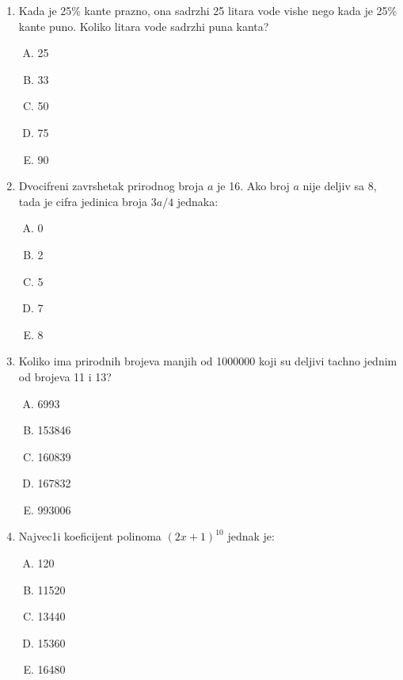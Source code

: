 \documentclass[a4paper,12pt]{article}
\newcommand{\Lat}{\fontencoding{OT1}\selectfont}
\begin{document}
\begin{enumerate}[1.]
\item Kada je 25\% kante prazno, ona sadrzhi 25 litara vode vishe nego kada je 25\% kante puno. Koliko litara vode sadrzhi puna kanta?
{\Lat
\begin{multicols}{5}
\begin{enumerate}[A)]
\item 25 \item 33 \item 50 \item 75 \item 90
\end{enumerate}
\end{multicols}
}
\item Dvocifreni zavrshetak prirodnog broja $a$ je 16. Ako broj $a$ nije deljiv sa 8, tada je cifra jedinica broja $3a/4$ jednaka:
{\Lat
\begin{multicols}{5}
\begin{enumerate}[A)]
\item 0 \item 2 \item 5 \item 7 \item 8
\end{enumerate}
\end{multicols}
}
\item Koliko ima prirodnih brojeva manjih od 1000000 koji su deljivi tachno jednim od brojeva 11 i 13?
{\Lat
\begin{multicols}{5}
\begin{enumerate}[A)]
\item 6993 \item 153846 \item 160839 \item 167832 \item 993006
\end{enumerate}
\end{multicols}
}

\item Najvec1i koeficijent polinoma $(2x + 1)^{10} $ jednak je:
{\Lat
\begin{multicols}{5}
\begin{enumerate}[A)]
\item 120 \item 11520 \item 13440 \item 15360 \item 16480
\end{enumerate}
\end{multicols} 
}


\end{enumerate}
\end{document}
